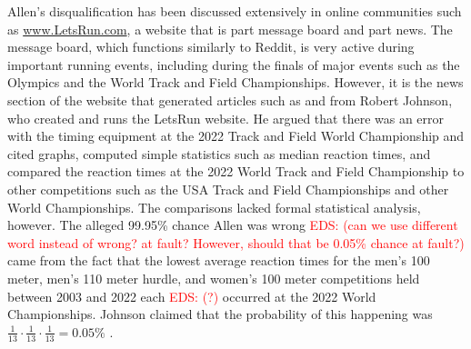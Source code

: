 \documentclass[12pt, letterpaper, titlepage]{article}
\newcommand{\eds}[1]{\textcolor{red}{EDS: (#1)}}
\newcommand{\of}[1]{\textcolor{violet}{OF: #1}}
\begin{document}
Allen's disqualification has been discussed extensively in online communities
such as \url{www.LetsRun.com}, a website that is part message board and part
news. The message board,
which functions similarly to Reddit, is very active during important running
events, including during the finals of major events such as
the Olympics and the World Track and Field Championships.  However, it is the
news section of the website that generated articles such as \citet{johnson2022data}
and \citet{johnson2022was} from  Robert Johnson, who created and runs 
the LetsRun website.  He argued that there was an error
with the timing equipment at the 2022 Track and Field World Championship and
cited graphs, computed simple statistics such as median reaction times, and 
compared the reaction times at the 2022 World Track and Field Championship to 
other competitions
such as the USA Track and Field Championships and other World Championships.
The comparisons lacked formal statistical analysis, however. 
The alleged 99.95\% chance Allen was wrong \eds{can we use different word 
instead of wrong?  at fault?  However, should that be 0.05\% chance at fault?}
came from the fact that the lowest average reaction times for the men's 100 meter,
men's 110 meter hurdle, and women's 100 meter competitions held between 2003 and 
2022 each \eds{?} occurred at the 2022 World 
Championships.  Johnson claimed that the probability of this
happening was $\frac{1}{13} \cdot \frac{1}{13} \cdot \frac{1}{13} = 0.05\%$
\citep{johnson2022was}.
\end{document}

